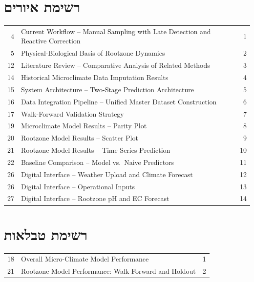 \documentclass[a4paper,12pt]{article}
\begin{document}


\newpage
{}
\tableofcontents

\newpage
\renewcommand{\listfigurename}{רשימת איורים}
\section*{\listfigurename}
\begin{LTR}
\noindent\begin{tabularx}{\textwidth}{@{}r@{\quad}>{\raggedright\arraybackslash}X@{\quad}r@{}}
4  & Current Workflow -- Manual Sampling with Late Detection and Reactive Correction & 1 \\
5  & Physical-Biological Basis of Rootzone Dynamics & 2 \\
12 & Literature Review -- Comparative Analysis of Related Methods & 3 \\
14 & Historical Microclimate Data Imputation Results & 4 \\
15 & System Architecture -- Two-Stage Prediction Architecture & 5 \\
16 & Data Integration Pipeline -- Unified Master Dataset Construction & 6 \\
17 & Walk-Forward Validation Strategy & 7 \\
19 & Microclimate Model Results -- Parity Plot & 8 \\
20 & Rootzone Model Results -- Scatter Plot & 9 \\
21 & Rootzone Model Results -- Time-Series Prediction & 10 \\
22 & Baseline Comparison -- Model vs.\ Naive Predictors & 11 \\
26 & Digital Interface -- Weather Upload and Climate Forecast & 12 \\
26 & Digital Interface -- Operational Inputs & 13 \\
27 & Digital Interface -- Rootzone pH and EC Forecast & 14
\end{tabularx}
\end{LTR}

\renewcommand{\listtablename}{רשימת טבלאות}
\section*{\listtablename}
\begin{LTR}
\noindent\begin{tabularx}{\textwidth}{@{}r@{\quad}>{\raggedright\arraybackslash}X@{\quad}r@{}}
18 & Overall Micro-Climate Model Performance & 1 \\
21 & Rootzone Model Performance: Walk-Forward and Holdout & 2
\end{tabularx}
\end{LTR}
\end{document}
